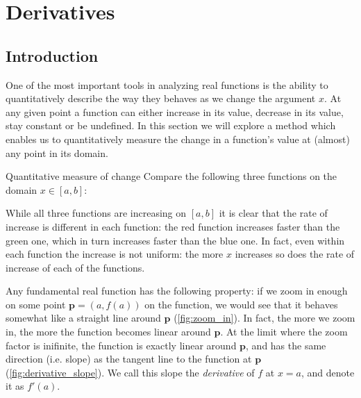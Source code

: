 \section{Derivatives}
\label{sec:derivatives}

\subsection{Introduction}
\label{sub:introduction}

One of the most important tools in analyzing real functions is the ability to quantitatively describe the way they behaves as we change the argument $x$. At any given point a function can either increase in its value, decrease in its value, stay constant or be undefined. In this section we will explore a method which enables us to quantitatively measure the change in a function's value at (almost) any point in its domain.

\begin{example}{Quantitative measure of change}{}
  Compare the following three functions on the domain $x\in[a,b]$:

  \centering

  \flushleft
  While all three functions are increasing on $[a,b]$ it is clear that the rate of increase is different in each function: the red function increases faster than the green one, which in turn increases faster than the blue one. In fact, even within each function the increase is not uniform: the more $x$ increases so does the rate of increase of each of the functions.
\end{example}

Any fundamental real function has the following property: if we zoom in enough on some point $\bm{p}=\left(a,f\left(a\right)\right)$ on the function, we would see that it behaves somewhat like a straight line around $\bm{p}$ (\autoref{fig:zoom_in}). In fact, the more we zoom in, the more the function becomes linear around $\bm{p}$. At the limit where the zoom factor is inifinite, the function is exactly linear around $\bm{p}$, and has the same direction (i.e. slope) as the tangent line to the function at $\bm{p}$ (\autoref{fig:derivative_slope}). We call this slope the \emph{derivative} of $f$ at $x=a$, and denote it as $f'(a)$.

